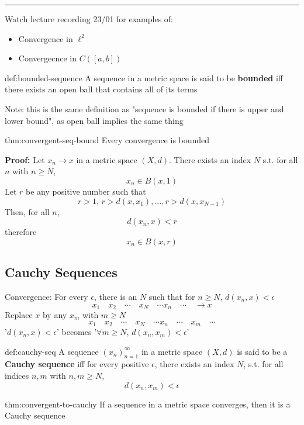 \documentclass{article}
\begin{document}
\noindent\rule{\textwidth}{0.2pt}

Watch lecture recording 23/01 for examples of:
\begin{itemize}
    \item Convergence in $\ell^{2}$
    \item Convergecnce in $C([a,b])$
\end{itemize}


\begin{dfn}{def:bounded-sequence}{}
    A sequence in a metric space is said to be \textbf{bounded} iff there exists an open ball that contains all of its terms
\end{dfn}

Note: this is the same definition as "sequence is bounded if there is upper and lower bound", as open ball implies the same thing

\begin{thm}[]{thm:convergent-seq-bound}{}
    Every convergence is bounded
\end{thm}

\textbf{Proof:} Let $x_{n}\to x$ in a metric space $(X,d)$. There exists an index $N$ s.t. for all $n$ with $n\ge N$,
\[x_{n}\in B(x,1)\]
Let $r$ be any positive number such that
\[r>1,\,r>d(x,x_{1}),\dots,r>d(x,x_{N-1})\]
Then, for all $n$,
\[d(x_{n}, x) < r\]
therefore
\[x_{n}\in B(x,r)\]

\subsection{Cauchy Sequences}
Convergence: For every $\epsilon$, there is an $N$ such that for $n\ge N$, $d(x_{n}, x) < \epsilon$
\[x_{1}\quad x_{2} \quad \cdots \quad x_{N} \quad \cdots x_{n} \quad \cdots \quad \to x\]
Replace $x$ by any $x_{m}$ with $m \ge N$
\[x_{1}\quad x_{2} \quad \cdots \quad x_{N} \quad \cdots x_{n} \quad \cdots \quad x_{m} \quad \cdots\]
'$d(x_{n}, x) < \epsilon$' becomes '$\forall m \ge N,\,d(x_{n}, x_{m}) < \epsilon$'

\begin{dfn}{def:cauchy-seq}{}
    A sequence $(x_{n})^{\infty}_{n=1}$ in a metric space $(X,d)$ is said to be a \textbf{Cauchy sequence} iff for every positive $\epsilon$, there exists an index $N$, s.t. for all indices $n,m$ with $n,m\ge N$,
    \[d(x_{n}, x_{m}) < \epsilon\]
\end{dfn}

\begin{thm}[]{thm:convergent-to-cauchy}{}
    If a sequence in a metric space converges, then it is a Cauchy sequence
\end{thm}
\end{document}
